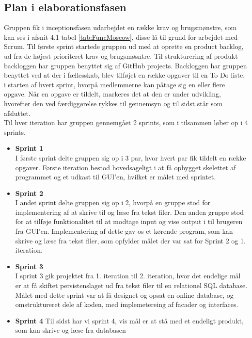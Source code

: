 \subsection{Plan i elaborationsfasen}
Gruppen fik i inceptionsfasen udarbejdet en række krav og brugsmønstre, som kan ses i afsnit 4.1 tabel \ref{tab:FuncMoscow}, disse lå til grund for arbejdet med Scrum. Til første sprint startede gruppen ud med at oprette en product backlog, ud fra de højest prioriteret krav og brugsmøsntre. Til strukturering af produkt backloggen har gruppen benyttet sig af GitHub projects. Backloggen har gruppen benyttet ved at der i fællesskab, blev tilføjet en række opgaver til en To Do liste, i starten af hvert sprint, hvorpå medlemmerne kan påtage sig en eller flere opgave. Når en opgave er tildelt, markeres det at den er under udvikling, hvorefter den ved færdiggørelse rykkes til gennemsyn og til sidst står som afsluttet. \\
Til hver iteration har gruppen gennemgået 2 sprints, som i tilsammen løber op i 4 sprints. 
\begin{itemize}
    \item \textbf{Sprint 1} \\
    I første sprint delte gruppen sig op i 3 par, hvor hvert par fik tildelt en række opgaver. Første iteration bestod hovedsageligt i at få opbygget skelettet af programmet og et udkast til GUI'en, hvilket er målet med sprintet. 
    \item \textbf{Sprint 2} \\
    I andet sprint delte gruppen sig op i 2, hvorpå en gruppe stod for implementering af at skrive til og læse fra tekst filer. Den anden gruppe stod for at tilføje funktionalitet til at modtage input og vise output i til brugeren fra GUI'en. Implementering af dette gav os et kørende program, som kan skrive og læse fra tekst filer, som opfylder målet der var sat for Sprint 2 og 1. iteration.
    \item \textbf{Sprint 3} \\
    I sprint 3 gik projektet fra 1. iteration til 2. iteration, hvor det endelige mål er at få skiftet persistenslaget ud fra tekst filer til en relationel SQL database. Målet med dette sprint var at få designet og opsat en online database, og omstruktureret dele af koden, med implemetereing af facader og interfaces. 
    \item \textbf{Sprint 4}
    Til sidst har vi sprint 4, vis mål er at stå med et endeligt produkt, som kan skrive og læse fra databasen 
\end{itemize}
